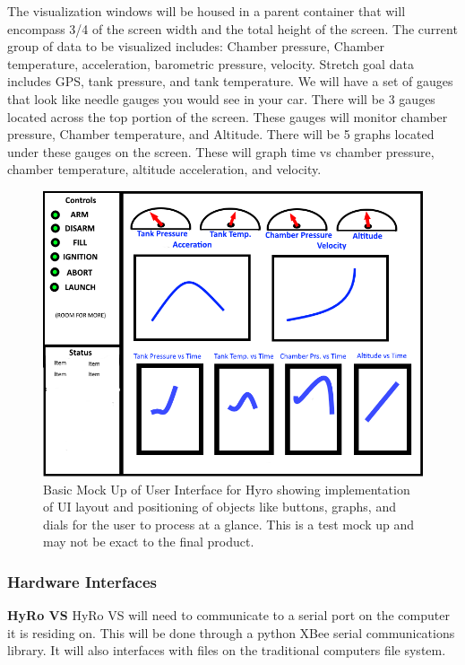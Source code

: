 \documentclass[10pt,draftclsnofoot,onecolumn,compsoc]{IEEEtran}
\begin{document}
 
The visualization windows will be housed in a parent container that will encompass 3/4 of the screen width and the total height of the screen. The current group of data to be visualized includes: Chamber pressure, Chamber temperature, acceleration, barometric pressure, velocity. Stretch goal data includes GPS, tank pressure, and tank temperature. We will have a set of gauges that look like needle gauges you would see in your car. There will be 3 gauges located across the top portion of the screen. These gauges will monitor chamber pressure, Chamber temperature, and Altitude. There will be 5 graphs located under these gauges on the screen. These will graph time vs chamber pressure, chamber temperature, altitude acceleration, and velocity.\par


\begin{figure}
  \caption{Basic Mock Up of User Interface for Hyro showing implementation of UI layout and positioning of objects like buttons, graphs, and dials for the user to process at a glance. This is a test mock up and may not be exact to the final product. }
  \centering
	\includegraphics[scale=.75]{HyRoUIMockup}
\end{figure}
\FloatBarrier
\subsubsection{Hardware Interfaces}

{\bf HyRo VS}
HyRo VS will need to communicate to a serial port on the computer it is residing on.  This will be done through a python XBee serial communications library. It will also interfaces with files on the traditional computers file system.
\end{document}
